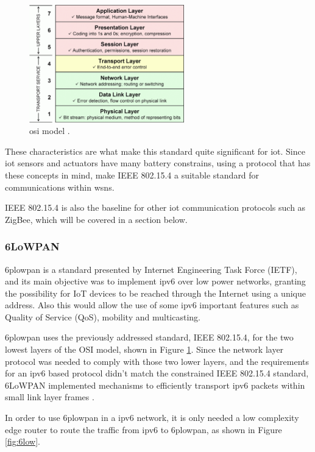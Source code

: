 \begin{figure}[H]
	\centering
	\includegraphics[width=0.6\textwidth]{figures/osi.png}
	\caption{\acf{osi} model \cite{Zikrillah}.}
	\label{fig:osi}
\end{figure}

These characteristics are what make this standard quite significant for \ac{iot}. Since \ac{iot} sensors and actuators have many battery constrains, using a protocol that has these concepts in mind, make IEEE 802.15.4 a suitable standard for communications within \ac{wsn}s.

IEEE 802.15.4 is also the baseline for other \ac{iot} communication protocols such as ZigBee, which will be covered in a section below.


\subsubsection{6LoWPAN}
\acf{6plowpan} is a standard presented by Internet Engineering Task Force (IETF), and its main objective was to implement \ac{ipv6} over low power networks, granting the possibility for IoT devices to be reached through the Internet using a unique address. Also this would allow the use of some \ac{ipv6} important features such as Quality of Service (QoS), mobility and multicasting.

\ac{6plowpan} uses the previously addressed standard, IEEE 802.15.4, for the two lowest layers of the OSI model, shown in Figure \ref{fig:osi}. Since the network layer protocol was needed to comply with those two lower layers, and the requirements for an \ac{ipv6} based protocol didn't match the constrained IEEE 802.15.4 standard, 6LoWPAN implemented mechanisms to efficiently transport \ac{ipv6} packets within small link layer frames \cite{chalappuram2016}. 

In order to use \ac{6plowpan} in a \ac{ipv6} network, it is only needed a low complexity edge router to route the traffic from \ac{ipv6} to \ac{6plowpan}, as shown in Figure \ref{fig:6low}. 

